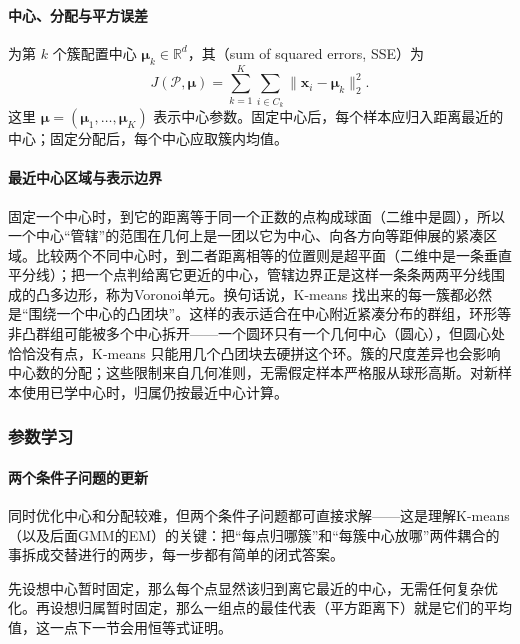 \paragraph{中心、分配与平方误差}

为第 $k$ 个簇配置中心 $\bm{\mu}_k\in\mathbb{R}^d$，其（sum of squared errors, SSE）为
\begin{equation}
  J(\mathcal{P},\bm{\mu})
  =\sum_{k=1}^K\sum_{i\in C_k}
    \lVert\bm{x}_i-\bm{\mu}_k\rVert_2^2.
  \label{eq:clustering-sse}
\end{equation}
这里 $\bm{\mu}=(\bm{\mu}_1,\ldots,\bm{\mu}_K)$ 表示中心参数。固定中心后，每个样本应归入距离最近的中心；固定分配后，每个中心应取簇内均值。

\paragraph{最近中心区域与表示边界}

固定一个中心时，到它的距离等于同一个正数的点构成球面（二维中是圆），所以一个中心“管辖”的范围在几何上是一团以它为中心、向各方向等距伸展的紧凑区域。比较两个不同中心时，到二者距离相等的位置则是超平面（二维中是一条垂直平分线）；把一个点判给离它更近的中心，管辖边界正是这样一条条两两平分线围成的凸多边形，称为Voronoi单元。换句话说，K-means 找出来的每一簇都必然是“围绕一个中心的凸团块”。这样的表示适合在中心附近紧凑分布的群组，环形等非凸群组可能被多个中心拆开——一个圆环只有一个几何中心（圆心），但圆心处恰恰没有点，K-means 只能用几个凸团块去硬拼这个环。簇的尺度差异也会影响中心数的分配；这些限制来自几何准则，无需假定样本严格服从球形高斯。对新样本使用已学中心时，归属仍按最近中心计算。

\subsubsection{参数学习}

\paragraph{两个条件子问题的更新}

同时优化中心和分配较难，但两个条件子问题都可直接求解——这是理解K-means（以及后面GMM的EM）的关键：把“每点归哪簇”和“每簇中心放哪”两件耦合的事拆成交替进行的两步，每一步都有简单的闭式答案。

先设想中心暂时固定，那么每个点显然该归到离它最近的中心，无需任何复杂优化。再设想归属暂时固定，那么一组点的最佳代表（平方距离下）就是它们的平均值，这一点下一节会用恒等式证明。

